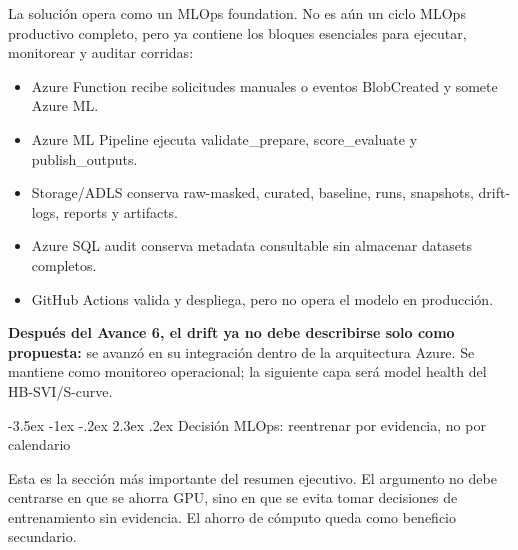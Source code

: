 \documentclass[11pt,letterpaper]{article}
\makeatletter
\renewcommand\section{\@startsection{section}{1}{\z@}
  {-3.5ex \@plus -1ex \@minus -.2ex}
  {2.3ex \@plus .2ex}
  {\Large\bfseries\sffamily\color{azulTec}}}
\newcommand{\statusbox}[1]{\colorbox{verdeClaro}{\parbox{\dimexpr\linewidth-2\fboxsep}{#1}}}
\makeatother
\begin{document}
La solución opera como un MLOps foundation. No es aún un ciclo MLOps productivo completo, pero ya contiene los bloques esenciales para ejecutar, monitorear y auditar corridas:

\begin{itemize}
  \item Azure Function recibe solicitudes manuales o eventos BlobCreated y somete Azure ML.
  \item Azure ML Pipeline ejecuta validate\_prepare, score\_evaluate y publish\_outputs.
  \item Storage/ADLS conserva raw-masked, curated, baseline, runs, snapshots, drift-logs, reports y artifacts.
  \item Azure SQL audit conserva metadata consultable sin almacenar datasets completos.
  \item GitHub Actions valida y despliega, pero no opera el modelo en producción.
\end{itemize}

\statusbox{\textbf{Después del Avance 6, el drift ya no debe describirse solo como propuesta:} se avanzó en su integración dentro de la arquitectura Azure. Se mantiene como monitoreo operacional; la siguiente capa será model health del HB-SVI/S-curve.}

\section{Decisión MLOps: reentrenar por evidencia, no por calendario}

Esta es la sección más importante del resumen ejecutivo. El argumento no debe centrarse en que se ahorra GPU, sino en que se evita tomar decisiones de entrenamiento sin evidencia. El ahorro de cómputo queda como beneficio secundario.
\end{document}
